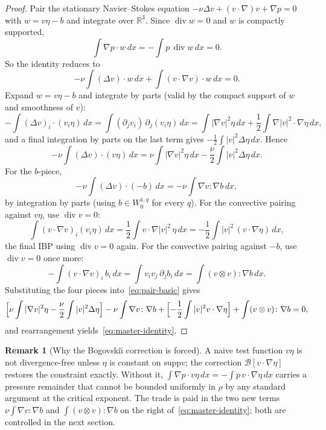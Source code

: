 \documentclass[11pt]{amsart}
\theoremstyle{definition}
\newtheorem{remark}[theorem]{Remark}
\newcommand{\RR}{\mathbb{R}}
\newcommand{\BB}{\mathcal{B}}    %
\newcommand{\abs}[1]{|#1|}
\newcommand{\supp}{\mathrm{supp}}
\DeclareMathOperator{\dv}{div}
\begin{document}
\begin{proof}
Pair the stationary Navier--Stokes equation
$-\nu\Delta v + (v \cdot \nabla) v + \nabla p = 0$ with
$w = v\eta - b$ and integrate over $\RR^3$. Since $\dv w = 0$ and
$w$ is compactly supported,
\[
\int \nabla p \cdot w\, dx = -\int p\, \dv w\, dx = 0.
\]
So the identity reduces to
\begin{equation}\label{eq:pair-basic}
-\nu \int (\Delta v) \cdot w\, dx + \int (v \cdot \nabla v) \cdot w\, dx = 0.
\end{equation}
Expand $w = v\eta - b$ and integrate by parts (valid by the
compact support of $w$ and smoothness of $v$):
\[
-\int (\Delta v)_i \cdot (v_i \eta)\, dx
= \int (\partial_j v_i)\,\partial_j(v_i \eta)\, dx
= \int \abs{\nabla v}^2 \eta\, dx
+ \frac{1}{2}\int \nabla \abs{v}^2 \cdot \nabla \eta\, dx,
\]
and a final integration by parts on the last term gives
$-\frac{1}{2}\int \abs{v}^2 \Delta \eta\, dx$. Hence
\[
-\nu \int (\Delta v) \cdot (v\eta)\, dx
= \nu \int \abs{\nabla v}^2 \eta\, dx - \frac{\nu}{2}\int \abs{v}^2 \Delta \eta\, dx.
\]
For the $b$-piece,
\[
-\nu \int (\Delta v) \cdot (-b)\, dx = -\nu \int \nabla v \colon \nabla b\, dx,
\]
by integration by parts (using $b \in W^{1,q}_0$ for every $q$).
For the convective pairing against $v\eta$, use $\dv v = 0$:
\[
\int (v \cdot \nabla v)_i (v_i \eta)\, dx
= \frac{1}{2}\int v \cdot \nabla \abs{v}^2 \, \eta \, dx
= -\frac{1}{2}\int \abs{v}^2\,(v \cdot \nabla \eta)\, dx,
\]
the final IBP using $\dv v = 0$ again. For the convective pairing
against $-b$, use $\dv v = 0$ once more:
\[
-\int (v \cdot \nabla v)_i\, b_i\, dx
= \int v_i v_j\, \partial_j b_i\, dx
= \int (v \otimes v) \colon \nabla b\, dx.
\]
Substituting the four pieces into~\eqref{eq:pair-basic} gives
\[
\Bigl[\nu \int \abs{\nabla v}^2 \eta - \frac{\nu}{2}\int \abs{v}^2 \Delta \eta\Bigr]
- \nu \int \nabla v \colon \nabla b
+ \Bigl[-\frac{1}{2}\int \abs{v}^2 v \cdot \nabla \eta\Bigr]
+ \int (v\otimes v) \colon \nabla b = 0,
\]
and rearrangement yields~\eqref{eq:master-identity}.
\end{proof}

\begin{remark}[Why the Bogovski\u{\i} correction is forced]
\label{rem:why-bogo}
A naive test function $v\eta$ is not divergence-free unless
$\eta$ is constant on $\supp v$; the correction
$\BB[v\cdot\nabla\eta]$ restores the constraint exactly. Without
it, $\int \nabla p \cdot v\eta\, dx = -\int p\,v\cdot\nabla\eta\,
dx$ carries a pressure remainder that cannot be bounded uniformly
in $\rho$ by any standard argument at the critical exponent. The
trade is paid in the two new terms
$\nu \int \nabla v \colon \nabla b$ and $\int (v\otimes v) \colon
\nabla b$ on the right of~\eqref{eq:master-identity}; both are
controlled in the next section.
\end{remark}
\end{document}

